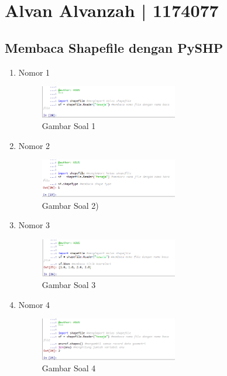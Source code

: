 \section{Alvan Alvanzah | 1174077}
\subsection{Membaca Shapefile dengan PySHP}
\begin{enumerate}
 \item Nomor 1
 
 \begin{figure}[H]
  \includegraphics[width=6cm]{figures/Tugas3/1174077/no1.png}
  \centering
  \caption{Gambar Soal 1}
 \end{figure}
 \item Nomor 2
 
 \begin{figure}[H]
  \includegraphics[width=6cm]{figures/Tugas3/1174077/no2.png}
  \centering
  \caption{Gambar Soal 2)}
 \end{figure}
 \item Nomor 3
 
 \begin{figure}[H]
  \includegraphics[width=6cm]{figures/Tugas3/1174077/no3.png}
  \centering
  \caption{Gambar Soal 3}
 \end{figure}
 \item Nomor 4
 
 \begin{figure}[H]
  \includegraphics[width=6cm]{figures/Tugas3/1174077/no4.png}
  \centering
  \caption{Gambar Soal 4}
 \end{figure}

\end{enumerate}
